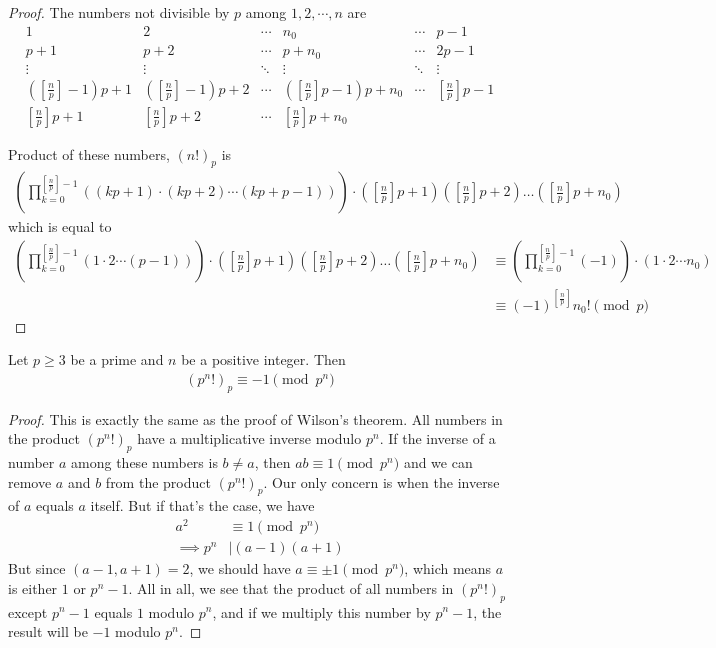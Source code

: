 	\begin{proof}
		The numbers not divisible by $p$ among $1, 2, \cdots, n$ are
			\[\begin{array}{*{20}{c}}
				1&2& \cdots &{{n_0}}& \cdots &{p - 1}\\
				{p + 1}&{p + 2}& \cdots &{p + {n_0}}& \cdots &{2p - 1}\\
				\vdots & \vdots & \ddots & \vdots & \ddots & \vdots \\
				{( {[\frac{n}{p}] - 1} )p + 1}&{( {[\frac{n}{p}] - 1} )p + 2}& \cdots &{( {[\frac{n}{p}]p - 1} )p + {n_0}}& \cdots &{[\frac{n}{p}]p - 1}\\
				{[\frac{n}{p}]p + 1}&{[\frac{n}{p}]p + 2}& \cdots &{[\frac{n}{p}]p + {n_0}}&{}&{}
			\end{array}\]

	Product of these numbers, $(n!)_p$ is
		\begin{align*}
			\left(\prod_{k=0}^{[\frac np]-1}\!\!\left((kp+1)\cdot(kp+2)\cdots(kp+p-1)\right)\right)  \cdot
			\left([\tfrac np]p+1\right)\left([\tfrac np]p+2\right)\dots\left([\tfrac np]p+n_0\right)
		\end{align*}
	which is equal to
		\begin{align*}
			\left(\prod_{k=0}^{[\frac np]-1}\!\!\left(1\cdot2\cdots(p-1)\right)\right)  \cdot
			\left([\tfrac np]p+1\right)\left([\tfrac np]p+2\right)\dots\left([\tfrac np]p+n_0\right)
				& \equiv \left(\prod_{k=0}^{[\frac np]-1}\!\!\left(-1\right) \right) \cdot \left(
				1 \cdot 2 \cdots n_0\right)\\
				& \equiv(-1)^{[\frac np]} n_0!\pmod p
		\end{align*}
	\end{proof}


	\begin{proposition}
		Let $p\geq 3$ be a prime and $n$ be a positive integer. Then
			\begin{align*}
				(p^n!)_p \equiv -1 \pmod{p^n}
			\end{align*}
	\end{proposition}

	\begin{proof}
		This is exactly the same as the proof of Wilson's theorem. All numbers in the product $(p^n!)_p$ have a multiplicative inverse modulo $p^n$. If the inverse of a number $a$ among these numbers is $b \neq a$, then $a b \equiv 1 \pmod{p^n}$ and we can remove $a$ and $b$ from the product $(p^n!)_p$. Our only concern is when the inverse of $a$ equals $a$ itself. But if that's the case, we have
			\begin{align*}
				a^2
					& \equiv 1 \pmod{p^n}\\
				\implies p^n
					& \mid (a-1)(a+1)
			\end{align*}
		But since $(a-1,a+1)=2$, we should have $a \equiv \pm 1 \pmod{p^n}$, which means $a$ is either $1$ or $p^n-1$. All in all, we see that the product of all numbers in $(p^n!)_p$ except $p^n-1$ equals $1$ modulo $p^n$, and if we multiply this number by $p^n-1$, the result will be $-1$ modulo $p^n$.
	\end{proof}


